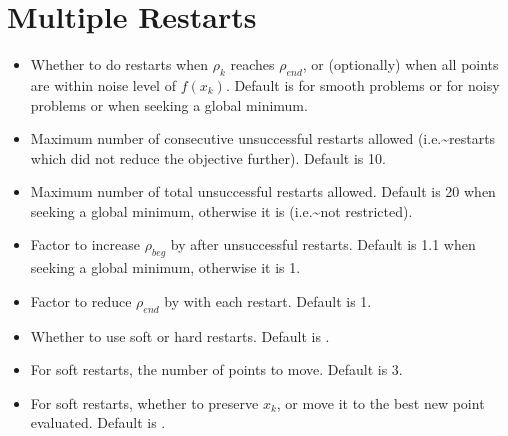 \documentclass[letterpaper,10pt,english]{sphinxmanual}
\begin{document}
\section{Multiple Restarts}
\label{\detokenize{advanced:multiple-restarts}}\begin{itemize}
\item {} 
 \sphinxhyphen{} Whether to do restarts when \(\rho_k\) reaches \(\rho_{end}\), or (optionally) when all points are within noise level of \(f(x_k)\). Default is  for smooth problems or  for noisy problems or when seeking a global minimum.

\item {} 
 \sphinxhyphen{} Maximum number of consecutive unsuccessful restarts allowed (i.e.\textasciitilde{}restarts which did not reduce the objective further). Default is 10.

\item {} 
 \sphinxhyphen{} Maximum number of total unsuccessful restarts allowed. Default is 20 when seeking a global minimum, otherwise it is  (i.e.\textasciitilde{}not restricted).

\item {} 
 \sphinxhyphen{} Factor to increase \(\rho_{beg}\) by after unsuccessful restarts. Default is 1.1 when seeking a global minimum, otherwise it is 1.

\item {} 
 \sphinxhyphen{} Factor to reduce \(\rho_{end}\) by with each restart. Default is 1.

\item {} 
 \sphinxhyphen{} Whether to use soft or hard restarts. Default is .

\item {} 
 \sphinxhyphen{} For soft restarts, the number of points to move. Default is 3.

\item {} 
 \sphinxhyphen{} For soft restarts, whether to preserve \(x_k\), or move it to the best new point evaluated. Default is .


\end{itemize}
\end{document}
